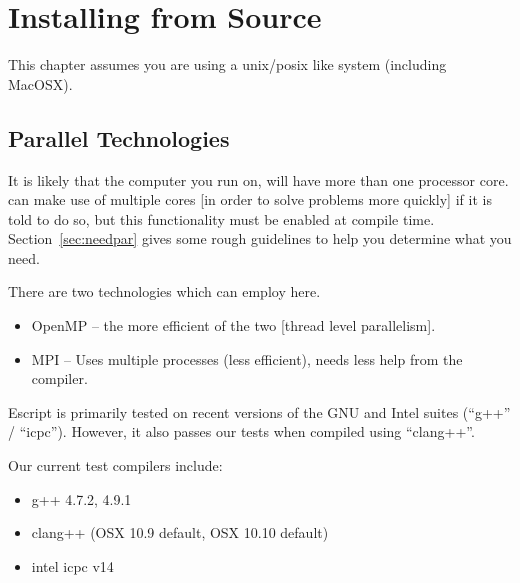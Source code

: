 %
%
%


\chapter{Installing from Source}\label{chap:source}

This chapter assumes you are using a unix/posix like system (including MacOSX).

\section{Parallel Technologies}\label{sec:par}
It is likely that the computer you run \escript on, will have more than one processor core.
\escript can make use of multiple cores [in order to solve problems more quickly] if it is told to do so,
but this functionality must be enabled at compile time.
Section~\ref{sec:needpar} gives some rough guidelines to help you determine what you need.

There are two technologies which \escript can employ here.
\begin{itemize}
 \item OpenMP -- the more efficient of the two [thread level parallelism].
 \item MPI -- Uses multiple processes (less efficient), needs less help from the compiler.
\end{itemize}

Escript is primarily tested on recent versions of the GNU and Intel suites (``g++'' / ``icpc'').
However, it also passes our tests when compiled using ``clang++''.

Our current test compilers include:
\begin{itemize}
 \item g++ 4.7.2, 4.9.1
 \item clang++ (OSX 10.9 default, OSX 10.10 default)
 \item intel icpc v14
\end{itemize}

